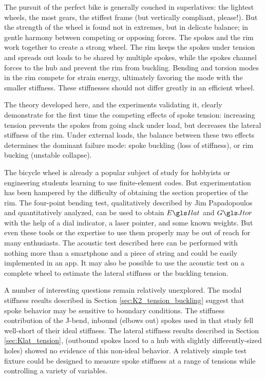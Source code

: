\documentclass[\rootdir/thesis.tex]{subfiles}
\begin{document}

The pursuit of the perfect bike is generally couched in superlatives: the lightest wheels, the most gears, the stiffest frame (but vertically compliant, please!). But the strength of the wheel is found not in extremes, but in delicate balance; in gentle harmony between competing or opposing forces. The spokes and the rim work together to create a strong wheel. The rim keeps the spokes under tension and spreads out loads to be shared by multiple spokes, while the spokes channel forces to the hub and prevent the rim from buckling. Bending and torsion modes in the rim compete for strain energy, ultimately favoring the mode with the smaller stiffness. These stiffnesses should not differ greatly in an efficient wheel.

The theory developed here, and the experiments validating it, clearly demonstrate for the first time the competing effects of spoke tension: increasing tension prevents the spokes from going slack under load, but decreases the lateral stiffness of the rim. Under external loads, the balance between these two effects determines the dominant failure mode: spoke buckling (loss of stiffness), or rim bucking (unstable collapse).

The bicycle wheel is already a popular subject of study for hobbyists or engineering students learning to use finite-element codes. But experimentation has been hampered by the difficulty of obtaining the section properties of the rim. The four-point bending test, qualitatively described by Jim Papadopoulos and quantitatively analyzed, can be used to obtain $\EIl$ and $\GJ$ with the help of a dial indicator, a laser pointer, and some known weights. But even these tools or the expertise to use them properly may be out of reach for many enthusiasts. The acoustic test described here can be performed with nothing more than a smartphone and a piece of string and could be easily implemented in an app. It may also be possible to use the acoustic test on a complete wheel to estimate the lateral stiffness or the buckling tension.

A number of interesting questions remain relatively unexplored. The modal stiffness results described in Section \ref{sec:K2_tension_buckling} suggest that spoke behavior may be sensitive to boundary conditions. The stiffness contribution of the J-bend, inbound (elbows out) spokes used in that study fell well-short of their ideal stiffness. The lateral stiffness results described in Section \ref{sec:Klat_tension}, (outbound spokes laced to a hub with slightly differently-sized holes) showed no evidence of this non-ideal behavior. A relatively simple test fixture could be designed to measure spoke stiffness at a range of tensions while controlling a variety of variables.
\end{document}
